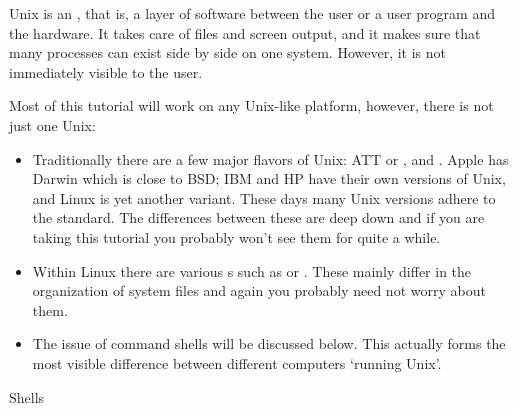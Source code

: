 
\lstset{language=shell,style=\snippetstyle}

Unix is an , that is, a layer of software
between the user or a user program and the hardware. It takes care of
files and screen output, and it makes sure that many processes can exist
side by side on one system. However, it is not immediately visible to
the user.

Most of this tutorial will work on any Unix-like platform,
however, there is not just one Unix:
\begin{itemize}
\item Traditionally there are a few major flavors of Unix:
  ATT or , and .
  Apple has Darwin which is close to BSD; IBM and HP have their own
  versions of Unix, and Linux is yet another variant.
  These days many Unix versions adhere to the  standard.
  The differences between
  these are deep down and if you are taking this tutorial you probably
  won't see them for quite a while.
\item Within Linux there are various
  s
  such as  or . These mainly differ
  in the organization of system files and again you probably need not worry
  about them.
\item The issue of command shells will be discussed below.
  This actually forms the most visible difference between different
  computers `running Unix'.
\end{itemize}


 {Shells}

